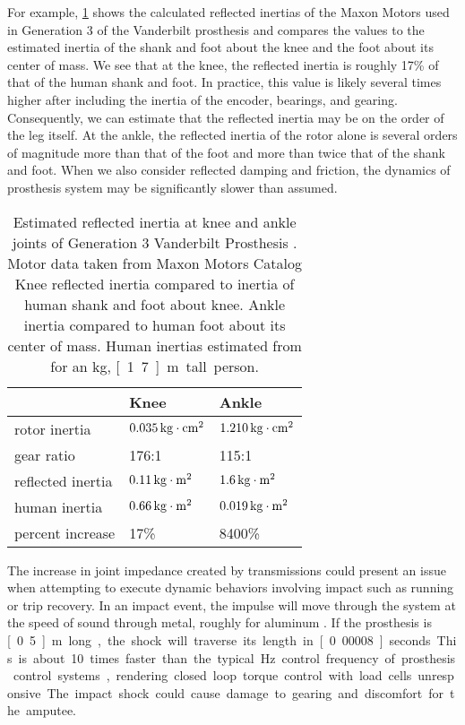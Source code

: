 For example, \cref{tab:vanderbilt_reflec_interita} shows the calculated
reflected inertias of the Maxon Motors used in Generation 3 of the Vanderbilt
prosthesis and compares the values to the estimated inertia of the shank and
foot about the knee and the foot about its center of mass. We see that at the
knee, the reflected inertia is roughly 17\% of that of the human shank and foot.
In practice, this value is likely several times higher after including the
inertia of the encoder, bearings, and gearing. Consequently, we can estimate
that the reflected inertia may be on the order of the leg itself. At the ankle,
the reflected inertia of the rotor alone is several orders of magnitude more
than that of the foot and more than twice that of the shank and foot. When we
also consider reflected damping and friction, the dynamics of prosthesis system
may be significantly slower than assumed.
\begin{table}[t]
  \centering
  \begin{tabular}{lll}
    \toprule
    & Knee & Ankle \\
    \midrule
    rotor inertia & $\unit[0.035]{kg \cdot cm^2}$ 
        & $\unit[1.210]{kg \cdot cm^2}$\\
    gear ratio & 176:1 & 115:1 \\
    reflected inertia & $\unit[0.11]{kg \cdot m^2}$ & 
        $\unit[1.6]{kg \cdot m^2}$\\
    human inertia & $\unit[0.66]{kg \cdot m^2}$  & $\unit[0.019]{kg \cdot m^2}$\\
    percent increase & 17\% & 8400\% \\
    \bottomrule
  \end{tabular}
  \caption{Estimated reflected inertia at knee and ankle joints of Generation 3
  Vanderbilt Prosthesis \citep{lawson2014robotic}. Motor data taken from Maxon
  Motors Catalog\citep{maxon_flat_motor,
  maxon_ec4pole} Knee reflected inertia compared to inertia of human shank and
  foot about knee. Ankle inertia compared to human foot about its center of
  mass. Human inertias estimated from \citet{winter2009biomechanics} for an
  \unit[85]{kg}, \unit[1.7]{m} tall person.}
  \label{tab:vanderbilt_reflec_interita}
\end{table}


The increase in joint impedance created by transmissions could present an issue
when attempting to execute dynamic behaviors involving impact such as running or
trip recovery. In an impact event, the impulse will move through the system at
the speed of sound through metal, roughly  for aluminum
\citep{lide2004crc}. If the prosthesis is \unit[0.5]{m} long, the shock will
traverse its length in \unit[0.00008]{seconds}. This is about 10 times faster
than the typical \unit[1000]{Hz} control frequency of prosthesis control
systems, rendering closed loop torque control with load cells unresponsive. The
impact shock could cause damage to gearing and discomfort for the amputee.

